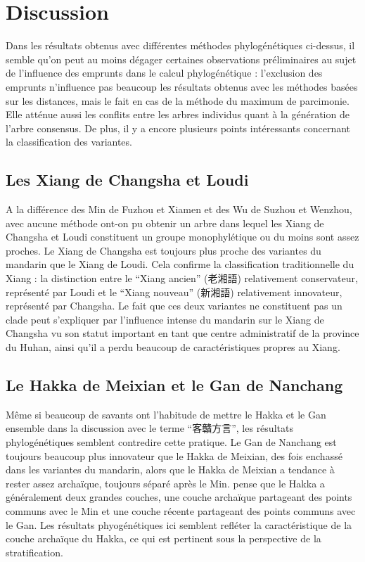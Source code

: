 \documentclass{scrbook}
\newcounter{c}[subsubsection]
\begin{document}
\begin{sloppypar}
\section{Discussion}
Dans les résultats obtenus avec différentes méthodes phylogénétiques ci-dessus, il semble qu'on peut au moins dégager certaines observations préliminaires au sujet de l'influence des emprunts dans le calcul phylogénétique : l'exclusion des emprunts n'influence pas beaucoup les résultats obtenus avec les méthodes basées sur les distances, mais le fait en cas de la méthode du maximum de parcimonie. Elle atténue aussi les conflits entre les arbres individus quant à la génération de l'arbre consensus. De plus, il y a encore plusieurs points intéressants concernant la classification des variantes.

\subsection{Les Xiang de Changsha et Loudi}
A la différence des Min de Fuzhou et Xiamen et des Wu de Suzhou et Wenzhou, avec aucune méthode ont-on pu obtenir un arbre dans lequel les Xiang de Changsha et Loudi constituent un groupe monophylétique ou du moins sont assez proches. Le Xiang de Changsha est toujours plus proche des variantes du mandarin que le Xiang de Loudi. Cela confirme la classification traditionnelle du Xiang : la distinction entre le ``Xiang ancien'' (老湘語) relativement conservateur, représenté par Loudi et le ``Xiang nouveau'' (新湘語) relativement innovateur, représenté par Changsha. Le fait que ces deux variantes ne constituent pas un clade peut s'expliquer par l'influence intense du mandarin sur le Xiang de Changsha vu son statut important en tant que centre administratif de la province du Huhan, ainsi qu'il a perdu beaucoup de caractéristiques propres au Xiang.

\subsection{Le Hakka de Meixian et le Gan de Nanchang}
Même si beaucoup de savants ont l'habitude de mettre le Hakka et le Gan ensemble dans la discussion avec le terme ``客贛方言'', les résultats phylogénétiques semblent contredire cette pratique. Le Gan de Nanchang est toujours beaucoup plus innovateur que le Hakka de Meixian, des fois enchassé dans les variantes du mandarin, alors que le Hakka de Meixian a tendance à rester assez archaïque, toujours séparé après le Min. \textcite[361]{Norman2003kejia} pense que le Hakka a généralement deux grandes couches, une couche archaïque partageant des points communs avec le Min et une couche récente partageant des points communs avec le Gan. Les résultats phyogénétiques ici semblent refléter la caractéristique de la couche archaïque du Hakka, ce qui est pertinent sous la perspective de la stratification. 


\end{sloppypar}
\end{document}
